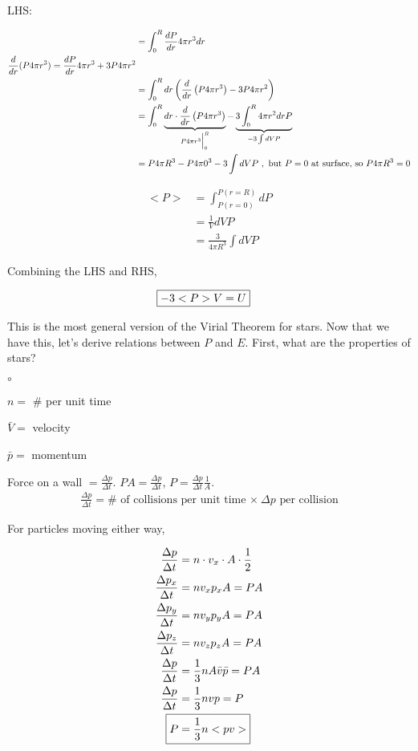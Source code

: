 \documentclass[10pt,letterpaper,final]{book}
\newcommand{\rp}{\right)}
\newcommand{\lp}{\left(}
\newcommand{\half}{\frac{1}{2}}
\begin{document}
LHS:

\begin{align}
&=\int_0^R \frac{dP}{dr}4\pi r^3 dr\\
\frac{d}{dr}(P 4 \pi r^3) = \frac{dP}{dr}4\pi r^3 + 3P4\pi r^2\\
&=\int_0^Rdr \lp \frac{d}{dr}\lp P4\pi r^3 \rp - 3P 4\pi r^2 \rp\\
&=\int_0^R \underbrace{dr \cdot  \frac{d}{dr}\lp P4\pi r^3 \rp}_{P 4 \pi r^3 \Bigl\lvert_0^R} - \underbrace{3 \int_0^R 4 \pi r^2drP }_{-3\int dVP}\\
&=P 4 \pi R^3 - P 4 \pi 0^3 - 3\int dVP~,\text{ but $P=0$ at surface, so $P4\pi R^3=0$}
\end{align}

\begin{align}
<P> &= \int_{P(r=0)}^{P(r=R)}dP\\
&= \frac{1}{V}dVP\\
&= \frac{3}{4 \pi R^3}\int dVP
\end{align}

Combining the LHS and RHS, 

\begin{align}
\Aboxed{-3<P>V &= U}
\end{align}

This is the most general version of the Virial Theorem for stars. Now that we have this, let's derive relations between $P$ and $E$. First, what are the properties of stars?

\begin{list}{$\circ$}{}
\item $n=$ \# per unit time
\item $\bar{V}=$ velocity
\item $\bar{p} =$ momentum
\end{list}

Force on a wall $= \frac{\Delta p}{\Delta t}$. $PA = \frac{\Delta p}{\Delta t}$, $P = \frac{\Delta p}{\Delta t}\frac{1}{A}$.\\

\begin{align}
\frac{\Delta p}{\Delta t} = \# \text{ of collisions per unit time $\times~ \Delta p$ per collision}
\end{align}

For particles moving either way, 

\begin{align}
\frac{\Delta p}{\Delta t} &= n\cdot v_x \cdot A \cdot \half\\
\frac{\Delta p_x}{\Delta t} &= nv_xp_xA = PA\\
\frac{\Delta p_y}{\Delta t} &= nv_yp_yA = PA\\
\frac{\Delta p_z}{\Delta t} &= nv_zp_zA = PA\\
\frac{\Delta p}{\Delta t} &=\frac{1}{3}nA\bar{v}\bar{p} = PA\\
\frac{\Delta p}{\Delta t} &=\frac{1}{3}nvp = P\\
\Aboxed{P &= \frac{1}{3}n<pv>}
\end{align}
\end{document}
